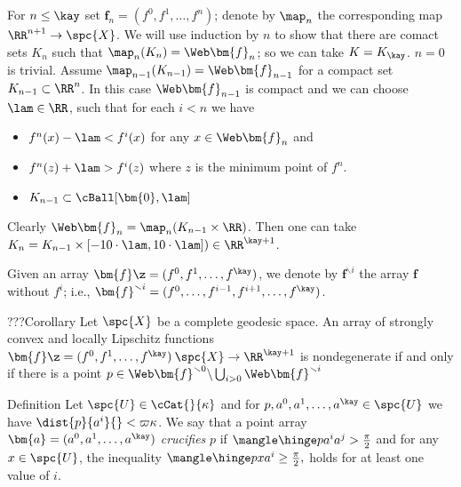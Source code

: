 For $n\le \kay$ set $\bm{f}_n=(f^0,f^1,\dots,f^n)$;
denote by $\map_n$ the corresponding map $\RR^{n+1}\to\spc{X}$.
We will use induction by $n$ to show that there are comact sets $K_n$ such that $\map_n(K_n)=\Web\bm{f}_n$;
so we can take $K=K_\kay$.
 $n=0$ is trivial.
 Assume $\map_{n-1}(K_{n-1})=\Web\bm{f}_{n-1}$ for a compact set $K_{n-1}\subset \RR^{n}$.
In this case $\Web\bm{f}_{n-1}$ is compact and we can choose  $\lam\in\RR$, 
such that for each $i<n$ we have
\begin{itemize}
\item $f^n(x)-\lam < f^i(x)$ for any $x\in \Web\bm{f}_n$ and
\item $f^n(z)+\lam > f^i(z)$ where $z$ is the minimum point of $f^n$.
\item $K_{n-1} \subset \cBall[\bm{0},\lam]$
\end{itemize}
Clearly $\Web\bm{f}_n=\map_n(K_{n-1}\times \RR)$.
Then one can take 
$K_n
=
K_{n-1}\times [-10\cdot\lam,10\cdot\lam])
\in 
\RR^{\kay+1}$.









Given an array $\bm{f}\z=(f^0,f^1,\dots,f^\kay)$,
we denote by $\bm{f}^{\smallsetminus i}$ the array $\bm{f}$ without $f^i$;
i.e., $\bm{f}^{\smallsetminus i}=(f^0,\dots,f^{i-1},f^{i+1},\dots,f^\kay)$.

\begin{thm}{???Corollary}
Let $\spc{X}$ be a complete geodesic space.
An array of strongly convex and locally Lipschitz functions 
$\bm{f}\z=(f^0,f^1,\dots,f^\kay)\:\spc{X}\to\RR^{\kay+1}$ 
is nondegenerate if and only if there is a point
$p\in \Web\bm{f}^{\smallsetminus 0}\backslash \bigcup_{i>0}\Web\bm{f}^{\smallsetminus i}$
\end{thm}
 










\begin{thm}{Definition}\label{def:crucify}
Let $\spc{U}\in\cCat{}{\kappa}$
and for $p,a^0,a^1,\dots,a^\kay\in\spc{U}$ we have
$\dist{p}{a^i}{}<\varpi\kappa$.
We say that a point array $\bm{a}=(a^0,a^1,\dots,a^\kay)$
\emph{crucifies} 
$p$ if 
$\mangle\hinge p{a^i}{a^j}>\tfrac\pi2$ and
 for any $x\in\spc{U}$, the inequality
$
\mangle\hinge p x {a^i}
\ge \frac\pi2,
$
holds for at least one value of $i$.
\end{thm} 

